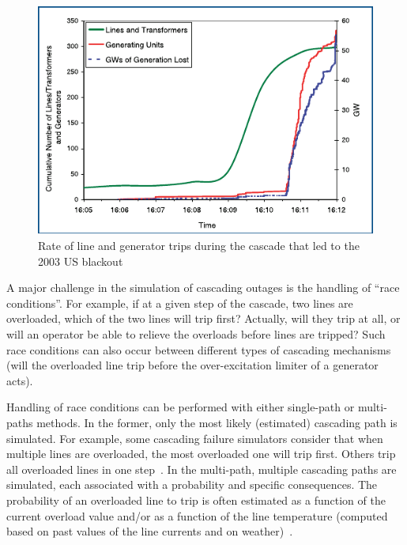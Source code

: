 \begin{figure}
    \centering
    \includegraphics[width=0.7\linewidth]{Figs/USBlackout2003.pdf}
    \caption{Rate of line and generator trips during the cascade that led to the 2003 US blackout~\cite{StabilityDefinitionRevised}}
    \label{fig:BlackoutUS2003}
\end{figure}

A major challenge in the simulation of cascading outages is the handling of ``race conditions''. For example, if at a given step of the cascade, two lines are overloaded, which of the two lines will trip first? Actually, will they trip at all, or will an operator be able to relieve the overloads before lines are tripped? Such race conditions can also occur between different types of cascading mechanisms (\eg will the overloaded line trip before the over-excitation limiter of a generator acts).


Handling of race conditions can be performed with either single-path or multi-paths methods. In the former, only the most likely (estimated) cascading path is simulated. For example, some cascading failure simulators consider that when multiple lines are overloaded, the most overloaded one will trip first. Others trip all overloaded lines in one step~\cite{ManchesterNoebels}. In the multi-path, multiple cascading paths are simulated, each associated with a probability and specific consequences. The probability of an overloaded line to trip is often estimated as a function of the current overload value and/or as a function of the line temperature (computed based on past values of the line currents and on weather)~\cite{Henneaux_level1}.

